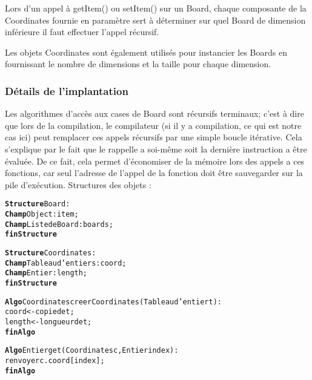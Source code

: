	Lors d'un appel à getItem() ou setItem() sur un Board, chaque composante de la Coordinates fournie en paramètre sert à déterminer sur quel Board de dimension inférieure il faut effectuer l'appel récursif. \newline

	Les objets Coordinates sont également utilisés pour instancier les Boards en fournissant le nombre de dimensions et la taille pour chaque dimension.

	\subsubsection{Détails de l'implantation}

	Les algorithmes d'accès aux cases de Board sont récursifs terminaux; c'est à dire que lors de la compilation, le compilateur (si il y a compilation, ce qui est notre cas ici) peut remplacer ces appels récursifs par une simple boucle itérative. Cela s'explique par le fait que le rappelle a soi-même soit la dernière instruction a être évaluée. De ce fait, cela permet d'économiser de la mémoire lors des appels a ces fonctions, car seul l'adresse de l'appel de la fonction doit être sauvegarder sur la pile d'exécution. \newline
	Structures des objets :

	\begin{alltt}
	{\bf Structure} Board :
    	{\bf Champ} Object : item;
    	{\bf Champ} Liste de Board : boards;
	{\bf fin Structure}
		
	{\bf Structure} Coordinates :
    	{\bf Champ} Tableau d'entiers : coord;
	    {\bf Champ} Entier : length;
	{\bf fin Structure}
	\end{alltt}


	
	\begin{alltt}
{\bf Algo} Coordinates creerCoordinates(Tableau d'entier t) :
    coord <- copie de t;
	length <- longueur de t;
{\bf finAlgo}
			
{\bf Algo} Entier get(Coordinates c, Entier index) :
    renvoyer c.coord[index];
{\bf finAlgo}
	\end{alltt}

		
	\newpage

